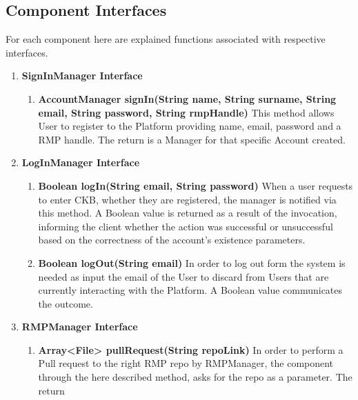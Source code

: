 \subsection{Component Interfaces}
For each component here are explained functions associated with respective interfaces.
\begin{enumerate}
    \item \textbf{SignInManager Interface} 
            \begin{enumerate}[label=$\bullet$]
                \item \textbf{AccountManager signIn(String name, String surname, String email, String password, String rmpHandle)} This method allows User to register to the Platform providing name, email, password and a RMP handle. 
                The return is a Manager for that specific Account created.
            \end{enumerate}
    \item \textbf{LogInManager Interface}
        \begin{enumerate}[label=$\bullet$]
            \item \textbf{Boolean logIn(String email, String password)} When a user requests to enter CKB, whether they are registered, the manager is notified via this method. A Boolean value is returned as a result of the 
            invocation, informing the client whether the action was successful or unsuccessful based on the correctness of the account's existence parameters.
            \item \textbf{Boolean logOut(String email)} In order to log out form the system is needed as input the email of the User to discard from Users that are currently interacting with the Platform. A Boolean value communicates 
            the outcome.
        \end{enumerate}
    \item \textbf{RMPManager Interface}
        \begin{enumerate}[label=$\bullet$]
            \item \textbf{Array<File> pullRequest(String repoLink)} In order to perform a Pull request to the right RMP repo by RMPManager, the component through the here described method, asks for the repo as a parameter. The return 

\end{enumerate}
\end{enumerate}
